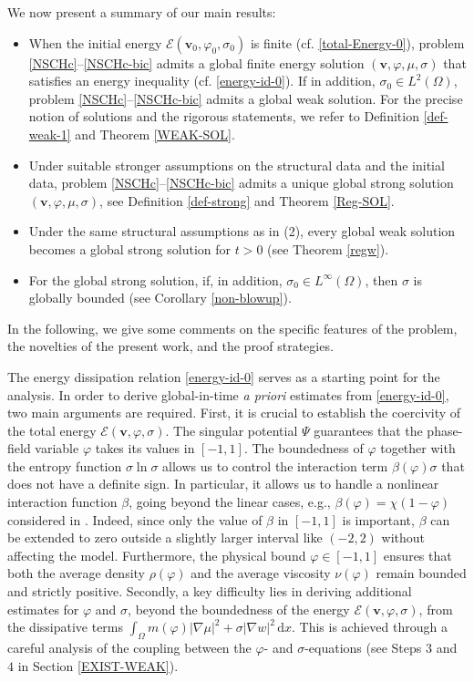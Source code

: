 \documentclass[11pt,reqno]{amsart}
\begin{document}
We now present a summary of our main results:
\begin{itemize}
\item[(1)] When the initial energy $\mathcal{E}(\bm{v}_0,\varphi_0,\sigma_0)$ is finite (cf. \eqref{total-Energy-0}), problem \eqref{NSCHc}--\eqref{NSCHc-bic} admits a global finite energy solution $(\bm{v},\varphi, \mu, \sigma)$ that satisfies an energy inequality (cf. \eqref{energy-id-0}).
If in addition, $\sigma_0\in L^2(\Omega)$, problem \eqref{NSCHc}--\eqref{NSCHc-bic} admits a global weak solution. For the precise notion of solutions and the rigorous statements, we refer to Definition \ref{def-weak-1} and Theorem \ref{WEAK-SOL}.
\item[(2)] Under suitable stronger assumptions on the structural data and the initial data, problem \eqref{NSCHc}--\eqref{NSCHc-bic} admits a unique global strong  solution $(\bm{v},\varphi, \mu, \sigma)$, see Definition \ref{def-strong} and Theorem \ref{Reg-SOL}.
\item[(3)] Under the same structural assumptions as in (2), every global weak solution becomes a global strong solution for $t > 0$ (see Theorem \ref{regw}).
\item[(4)] For the global strong solution, if, in addition, $\sigma_0\in L^\infty(\Omega)$, then $\sigma$ is globally bounded (see Corollary \ref{non-blowup}).
\end{itemize}

In the following, we give some comments on the specific features of the problem, the novelties of the present work, and the proof strategies.

The energy dissipation relation \eqref{energy-id-0} serves as a starting point for the analysis. In order to derive global-in-time \textit{a priori} estimates from \eqref{energy-id-0}, two main arguments are required.
First, it is crucial to establish the coercivity of the total energy $\mathcal{E}(\bm{v},\varphi, \sigma)$. The singular potential $\Psi$ guarantees that the phase-field variable $\varphi$ takes its values in $[-1,1]$. The boundedness of $\varphi$ together with the entropy function $\sigma\ln \sigma$ allows us to control the interaction term $\beta(\varphi)\sigma$ that does not have a definite sign. In particular, it allows us to handle a nonlinear interaction function $\beta$,
going beyond the linear cases, e.g., $\beta(\varphi)=\chi(1-\varphi)$
considered in \cite{AS24,GHW1,RSS2023,Sch24}. Indeed, since only the value of $\beta$ in $[-1,1]$ is important, $\beta$ can be extended to zero outside a slightly larger interval like $(-2, 2)$ without affecting the model. Furthermore, the physical bound $\varphi\in [-1,1]$ ensures that both the average density $\rho(\varphi)$ and the average viscosity $\nu(\varphi)$ remain bounded and strictly positive. Secondly, a key difficulty lies in deriving additional estimates for $\varphi$ and $\sigma$, beyond the boundedness of the energy $\mathcal{E}(\bm{v},\varphi, \sigma)$, from the dissipative terms $\int_{\Omega} m(\varphi)|\nabla \mu|^{2} +  \sigma|\nabla w|^2 \, \mathrm{d} x$. This is achieved through a careful analysis of the coupling between the $\varphi$- and $\sigma$-equations (see Steps $3$ and $4$ in Section \ref{EXIST-WEAK}).
\end{document}
